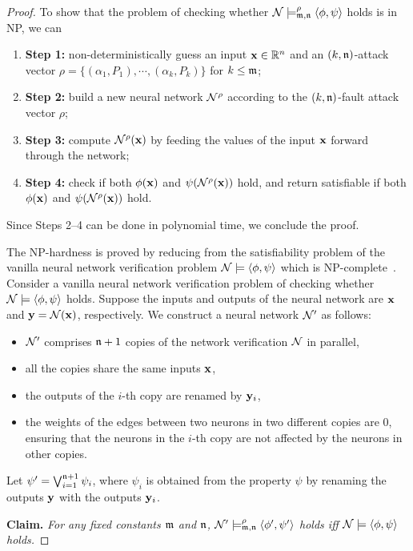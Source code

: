 \begin{proof}
To show that the problem of checking whether ${\mathcal{N}}\models^\rho_{\mathfrak{m},\mathfrak{n}}\langle \phi,\psi \rangle$ holds is in NP, we can
\begin{enumerate}
  \item {\bf Step 1:} non-deterministically guess an input ${\mathbf{x}}\in \mathbb{R}^n$ and an $(k,\mathfrak{n})$-attack vector $\rho=\{(\alpha_1,P_1),\cdots, (\alpha_k,P_k)\}$ for $k\leq \mathfrak{m}$;
  \item {\bf Step 2:} build a new neural network ${\mathcal{N}}^\rho$ according to the $(k,\mathfrak{n})$-fault attack vector $\rho$;
  \item {\bf Step 3:} compute ${\mathcal{N}}^\rho({\mathbf{x}})$  by feeding the values of the input ${\mathbf{x}}$ forward through the network;
  \item {\bf Step 4:} check if both $\phi({\mathbf{x}})$ and $\psi({\mathcal{N}}^\rho({\mathbf{x}}))$ hold, and return satisfiable if both $\phi({\mathbf{x}})$ and $\psi({\mathcal{N}}^\rho({\mathbf{x}}))$ hold.
\end{enumerate}
Since Steps 2--4 can be done in polynomial time, we conclude the proof.


The NP-hardness is proved by reducing from the satisfiability problem of the vanilla neural network verification problem ${\mathcal{N}}\models \langle \phi,\psi\rangle$ which is NP-complete~\cite{GuyKatz2017ReluplexAE}.
Consider a vanilla neural network verification problem of checking whether ${\mathcal{N}}\models \langle \phi,\psi\rangle$ holds.
Suppose the inputs and outputs of the neural network are ${\mathbf{x}}$ and ${\mathbf{y}} = {\mathcal{N}}({\mathbf{x}})$, respectively.
We construct a neural network  ${\mathcal{N}}'$ as follows:
\begin{itemize}
  \item ${\mathcal{N}}'$ comprises $\mathfrak{n}+1$ copies of the network verification ${\mathcal{N}}$ in parallel,
  \item all the copies share the same inputs ${\mathbf{x}}$,
  \item the outputs of the $i$-th copy are renamed by ${\mathbf{y}}_i$,
  \item the weights of the edges between two neurons in two different copies are $0$,  ensuring that the neurons
  in the $i$-th copy are not affected by the neurons in other copies.
\end{itemize}
Let $\psi'=\bigvee_{i=1}^{\mathfrak{n}+1}\psi_i$, where $\psi_i$ is obtained from the property $\psi$ by renaming
the outputs ${\mathbf{y}}$ with the outputs ${\mathbf{y}}_i$.

{\bf Claim.} \textit{For any fixed constants $\mathfrak{m}$ and $\mathfrak{n}$,
${\mathcal{N}}' \models^\rho_{\mathfrak{m},\mathfrak{n}} \langle \phi',\psi'\rangle$ holds
iff ${\mathcal{N}} \models \langle \phi,\psi\rangle$ holds.}


\end{proof}
